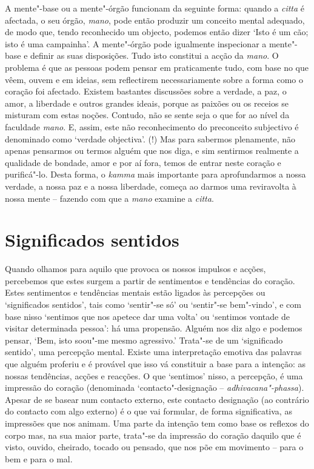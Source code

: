 A mente"-base ou a mente"-órgão funcionam da seguinte forma: quando a \emph{citta}
é afectada, o seu órgão, \emph{mano}, pode então produzir um conceito mental
adequado, de modo que, tendo reconhecido um objecto, podemos então dizer `Isto é
um cão; isto é uma campainha'. A mente"-órgão pode igualmente inspecionar a
mente"-base e definir as suas disposições. Tudo isto constitui a acção da
\emph{mano}. O problema é que as pessoas podem pensar em praticamente tudo, com
base no que vêem, ouvem e em ideias, sem reflectirem necessariamente sobre a
forma como o coração foi afectado. Existem bastantes discussões sobre a verdade,
a paz, o amor, a liberdade e outros grandes ideais, porque as paixões ou os
receios se misturam com estas noções. Contudo, não se sente seja o que for ao
nível da faculdade \emph{mano}. E, assim, este não reconhecimento do preconceito
subjectivo é denominado como `verdade objectiva'. (!) Mas para sabermos
plenamente, não apenas pensarmos ou termos alguém que nos diga, e sim sentirmos
realmente a qualidade de bondade, amor e por aí fora, temos de entrar neste
coração e purificá"-lo. Desta forma, o \emph{kamma} mais importante para
aprofundarmos a nossa verdade, a nossa paz e a nossa liberdade, começa ao darmos
uma reviravolta à nossa mente -- fazendo com que a \emph{mano} examine a
\emph{citta}.

\section{Significados sentidos}

Quando olhamos para aquilo que provoca os nossos impulsos e acções, percebemos
que estes surgem a partir de sentimentos e tendências do coração. Estes
sentimentos e tendências mentais estão ligados às percepções ou `significados
sentidos', tais como `sentir"-se só' ou `sentir"-se bem"-vindo', e com base nisso
`sentimos que nos apetece dar uma volta' ou `sentimos vontade de visitar
determinada pessoa': há uma propensão. Alguém nos diz algo e podemos pensar,
`Bem, isto soou"-me mesmo agressivo.' Trata"-se de um `significado sentido', uma
percepção mental. Existe uma interpretação emotiva das palavras que alguém
proferiu e é provável que isso vá constituir a base para a intenção: as nossas
tendências, acções e reacções. O que `sentimos' nisso, a percepção, é uma
impressão do coração (denominada `contacto"-designação --
\emph{adhivacana"-phassa}). Apesar de se basear num contacto externo, este
contacto designação (ao contrário do contacto com algo externo) é o que vai
formular, de forma significativa, as impressões que nos animam. Uma parte da
intenção tem como base os reflexos do corpo mas, na sua maior parte, trata"-se da
impressão do coração daquilo que é visto, ouvido, cheirado, tocado ou pensado,
que nos põe em movimento -- para o bem e para o mal.

